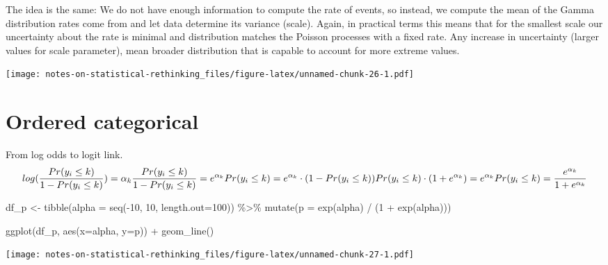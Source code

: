 \documentclass[
]{book}
\newenvironment{Shaded}{\begin{snugshade}}{\end{snugshade}}
\newcommand{\AttributeTok}[1]{\textcolor[rgb]{0.77,0.63,0.00}{#1}}
\newcommand{\DecValTok}[1]{\textcolor[rgb]{0.00,0.00,0.81}{#1}}
\newcommand{\FunctionTok}[1]{\textcolor[rgb]{0.00,0.00,0.00}{#1}}
\newcommand{\NormalTok}[1]{#1}
\newcommand{\OtherTok}[1]{\textcolor[rgb]{0.56,0.35,0.01}{#1}}
\newcommand{\SpecialCharTok}[1]{\textcolor[rgb]{0.00,0.00,0.00}{#1}}
\begin{document}
The idea is the same: We do not have enough information to compute the rate of events, so instead, we compute the mean of the Gamma distribution rates come from and let data determine its variance (scale). Again, in practical terms this means that for the smallest scale our uncertainty about the rate is minimal and distribution matches the Poisson processes with a fixed rate. Any increase in uncertainty (larger values for scale parameter), mean broader distribution that is capable to account for more extreme values.

\texttt{[image: notes-on-statistical-rethinking\_files/figure-latex/unnamed-chunk-26-1.pdf]}

\hypertarget{ordered-categorical}{%
\section{Ordered categorical}\label{ordered-categorical}}

From log odds to logit link.
\[
log(\frac{Pr(y_i \leq k)}{1 - Pr(y_i \leq k)}) = \alpha_k \\
\frac{Pr(y_i \leq k)}{1 - Pr(y_i \leq k)} = e^{\alpha_k} \\
Pr(y_i \leq k) = e^{\alpha_k} \cdot ( 1 - Pr(y_i \leq k)) \\
Pr(y_i \leq k) \cdot ( 1 + e^{\alpha_k}) = e^{\alpha_k} \\
Pr(y_i \leq k) = \frac{e^{\alpha_k}}{1 + e^{\alpha_k}}
\]

\begin{Shaded}
\begin{Highlighting}[]
\NormalTok{df\_p }\OtherTok{\textless{}{-}}
  \FunctionTok{tibble}\NormalTok{(}\AttributeTok{alpha =} \FunctionTok{seq}\NormalTok{(}\SpecialCharTok{{-}}\DecValTok{10}\NormalTok{, }\DecValTok{10}\NormalTok{, }\AttributeTok{length.out=}\DecValTok{100}\NormalTok{)) }\SpecialCharTok{\%\textgreater{}\%}
  \FunctionTok{mutate}\NormalTok{(}\AttributeTok{p =} \FunctionTok{exp}\NormalTok{(alpha) }\SpecialCharTok{/}\NormalTok{ (}\DecValTok{1} \SpecialCharTok{+} \FunctionTok{exp}\NormalTok{(alpha)))}

\FunctionTok{ggplot}\NormalTok{(df\_p, }\FunctionTok{aes}\NormalTok{(}\AttributeTok{x=}\NormalTok{alpha, }\AttributeTok{y=}\NormalTok{p)) }\SpecialCharTok{+} 
  \FunctionTok{geom\_line}\NormalTok{()}
\end{Highlighting}
\end{Shaded}

\texttt{[image: notes-on-statistical-rethinking\_files/figure-latex/unnamed-chunk-27-1.pdf]}
\end{document}
